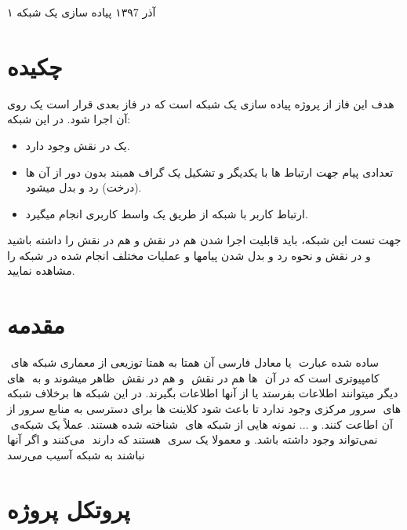 \documentclass{article}
\begin{document}
    \handout
    {}
    {۱}
    {آذر ۱۳۹7}
    {پیاده سازی یک شبکه     }
    
    \vspace{0.3cm}
    \section{چکیده}
هدف این فاز از پروژه پیاده سازی یک شبکه    است که در فاز بعدی قرار است یک   روی آن اجرا شود. در این شبکه:
    \begin{itemize}
\item	یک   در نقش   وجود دارد.
\item	 تعدادی پیام جهت ارتباط   ها با یکدیگر و تشکیل یک گراف همبند بدون دور از آن ها (درخت) رد و بدل میشود. 
\item	ارتباط کاربر با شبکه از طریق یک واسط کاربری انجام میگیرد.
    \end{itemize}
جهت تست این شبکه، باید قابلیت اجرا شدن هم در نقش  و هم در نقش  را داشته باشید و در نقش  و نحوه رد و بدل شدن پیامها و عملیات مختلف انجام شده در شبکه را مشاهده نمایید.\\
    \section{مقدمه}  
‌ ساده شده عبارت ‌ یا معادل فارسی آن همتا به همتا توزیعی از معماری شبکه های کامپیوتری است که در آن ‌ ها هم در نقش ‌ و هم در نقش ‌ ظاهر میشوند و به ‌ های دیگر میتوانند اطلاعات بفرستد یا از آنها اطلاعات بگیرند. در این شبکه ها برخلاف شبکه های ‌ سرور مرکزی وجود ندارد تا باعث شود کلاینت ها برای دسترسی به منابع سرور از آن اطاعت کنند.
‌و ... نمونه هایی از شبکه های ‌ شناخته شده هستند. عملاً یک شبکه‌ی ‌ نمی‌تواند وجود داشته باشد. و معمولا یک سری ‌  هستند که دارند ‌ می‌کنند و اگر آنها نباشند به شبکه آسیب می‌رسد
  \section{پروتکل پروژه}
\end{document}
